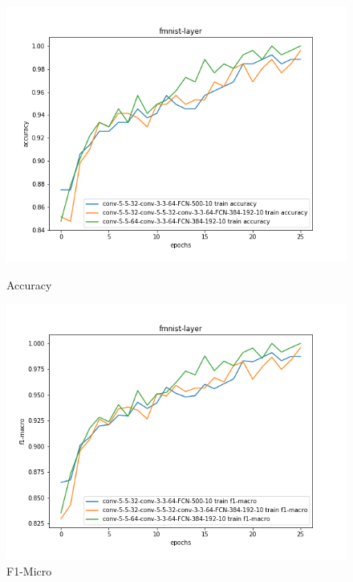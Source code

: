 \documentclass{article}
\begin{document}
\begin{figure}[!htb]
	\includegraphics[width=\linewidth]{../output_plots/FMNIST/task-1/fmnist-layer-Accuracy-accuracy.png}
	\caption{Accuracy}\label{fig:part_1_task_1_accuracy}
	\endminipage\hfill
	\includegraphics[width=\linewidth]{../output_plots/FMNIST/task-1/fmnist-layer-F1-macro-score-f1-macro.png}
	\caption{F1-Micro}\label{fig:part_1_task_1_f1-micro}
	\endminipage

\end{figure}
\end{document}
